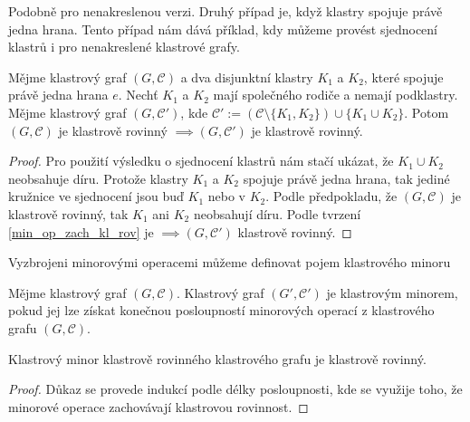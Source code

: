 Podobně pro nenakreslenou verzi. Druhý případ je, když klastry spojuje právě jedna hrana. Tento případ nám dává příklad, kdy můžeme provést sjednocení klastrů i pro nenakreslené klastrové grafy.
\begin{tvr}
Mějme klastrový graf  $(G, \mathcal C)$ a dva disjunktní klastry $K_1$ a $K_2$, které spojuje právě jedna hrana $e$. Nechť $K_1$ a $K_2$ mají společného rodiče a nemají podklastry. Mějme klastrový graf $(G, \mathcal C')$, kde  $\mathcal C'  := (\mathcal C \setminus \{K_1,K_2\}) \cup \{K_1 \cup K_2\}$. Potom $(G, \mathcal C)$ je klastrově rovinný $\implies (G, \mathcal C')$ je klastrově rovinný.
\end{tvr}
\begin{proof}
Pro použití výsledku o sjednocení klastrů nám stačí ukázat, že $K_1 \cup K_2$ neobsahuje díru. Protože klastry $K_1$ a $K_2$ spojuje právě jedna hrana, tak jediné kružnice ve sjednocení jsou buď $K_1$ nebo v $K_2$. Podle předpokladu, že $(G, \mathcal C)$ je klastrově rovinný, tak $K_1$ ani $K_2$ neobsahují díru. Podle tvrzení \ref{min_op_zach_kl_rov} je $\implies (G, \mathcal C')$ klastrově rovinný.
\end{proof}

Vyzbrojeni minorovými operacemi můžeme definovat pojem klastrového minoru

\begin{defn}
Mějme klastrový graf $(G,\mathcal C)$. Klastrový graf $(G',\mathcal C')$ je klastrovým minorem, pokud jej lze získat konečnou posloupností minorových operací z klastrového grafu $(G,\mathcal C)$.
\end{defn}

\begin{dusl} Klastrový minor klastrově rovinného klastrového grafu je klastrově rovinný.
\label{důsledek}
\end{dusl}
\begin{proof}
Důkaz se provede indukcí podle délky posloupnosti, kde se využije toho, že minorové operace zachovávají klastrovou rovinnost.
\end{proof}